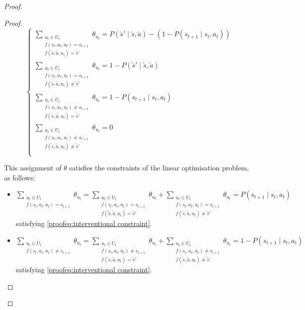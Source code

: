 \begin{proof}
\begin{proof}
%
%
%
%
%
%
%
%

\[
\begin{cases}
    \sum_{\substack{u_t \in U_t \\f(s_t, a_t, u_t) = s_{t+1} \\ f(\tilde{s}, \tilde{a}, u_t) = \tilde{s}'}} \theta_{u_t}= P(\tilde{s}' \mid \tilde{s}, \tilde{a}) - (1 - P(s_{t+1} \mid s_t, a_t))\\
    \sum_{\substack{u_t \in U_t \\f(s_t, a_t, u_t) = s_{t+1} \\ f(\tilde{s}, \tilde{a}, u_t) \neq \tilde{s}'}} \theta_{u_t} = 1 - P(\tilde{s}' \mid \tilde{s}, \tilde{a})\\
    \sum_{\substack{u_t \in U_t \\f(s_t, a_t, u_t) \neq s_{t+1} \\ f(\tilde{s}, \tilde{a}, u_t) = \tilde{s}'}} \theta_{u_t} = 1 - P(s_{t+1} \mid s_t, a_t)\\
    \sum_{\substack{u_t \in U_t \\f(s_t, a_t, u_t) \neq s_{t+1} \\ f(\tilde{s}, \tilde{a}, u_t) \neq \tilde{s}'}} \theta_{u_t} = 0\\
\end{cases}
\]

This assignment of $\theta$ satisfies the constraints of the linear optimisation problem, as follows:

%
%
%
%
%
%
%
%
%
%

\begin{itemize}        
    \item $\sum_{\substack{u_t \in U_t \\f(s_t, a_t, u_t) = s_{t+1}}} \theta_{u_t} = \sum_{\substack{u_t \in U_t \\f(s_t, a_t, u_t) = s_{t+1} \\ f(\tilde{s}, \tilde{a}, u_t) = \tilde{s}'}} \theta_{u_t} + \sum_{\substack{u_t \in U_t \\f(s_t, a_t, u_t) = s_{t+1} \\ f(\tilde{s}, \tilde{a}, u_t) \neq \tilde{s}'}} \theta_{u_t} = P(s_{t+1} \mid s_t, a_t)$ \\satisfying \eqref{proofeq:interventional constraint}.

    \item $\sum_{\substack{u_t \in U_t\\f(s_t, a_t, u_t) \neq s_{t+1}}}{\theta_{u_t}} = \sum_{\substack{u_t \in U_t \\f(s_t, a_t, u_t) \neq s_{t+1} \\ f(\tilde{s}, \tilde{a}, u_t) = \tilde{s}'}} \theta_{u_t} + \sum_{\substack{u_t \in U_t \\f(s_t, a_t, u_t) \neq s_{t+1} \\ f(\tilde{s}, \tilde{a}, u_t) \neq \tilde{s}'}} \theta_{u_t} =1 -
    P(s_{t+1} \mid s_t, a_t)$ satisfying \eqref{proofeq:interventional constraint}.
    

\end{itemize}
\end{proof}
\end{proof}
